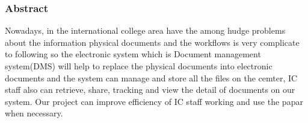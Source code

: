 \subsubsection{\huge{Abstract}}
Nowadays, in the international college area have the among hudge problems about the information physical documents and the workflows is very complicate to following so the electronic system which is Document management system(DMS) will help to replace the physical documents into electronic documents and the system can manage and store all the files on the cemter, IC staff also can retrieve, share, tracking and view the detail of documents on our system. 
Our project can improve efficiency of IC staff working and use the papar when necessary.
